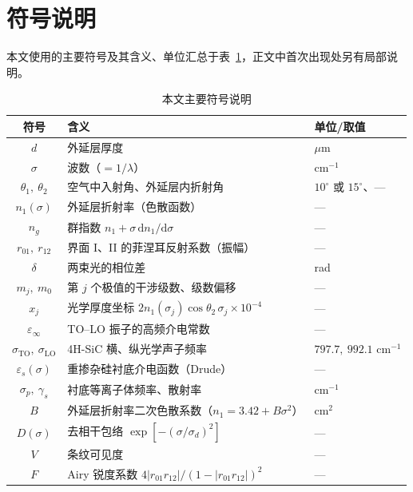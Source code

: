 \documentclass[11pt,a4paper,fontset=fandol]{ctexart}
\begin{document}
\section{符号说明}

本文使用的主要符号及其含义、单位汇总于表~\ref{tab:symbols}，正文中首次出现处另有局部说明。
\begin{table}[!htb]
    \centering
    \caption{本文主要符号说明}
    \label{tab:symbols}
    \small
    \begin{tabular}{cll}
        \toprule
        符号 & 含义 & 单位/取值 \\
        \midrule
        $d$ & 外延层厚度 & $\mu$m \\
        $\sigma$ & 波数（$=1/\lambda$） & cm$^{-1}$ \\
        $\theta_1,\ \theta_2$ & 空气中入射角、外延层内折射角 & $10^\circ$ 或 $15^\circ$、— \\
        $n_1(\sigma)$ & 外延层折射率（色散函数） & — \\
        $n_g$ & 群指数 $n_1+\sigma\,\mathrm{d}n_1/\mathrm{d}\sigma$ & — \\
        $r_{01},\ r_{12}$ & 界面 I、II 的菲涅耳反射系数（振幅） & — \\
        $\delta$ & 两束光的相位差 & rad \\
        $m_j,\ m_0$ & 第 $j$ 个极值的干涉级数、级数偏移 & — \\
        $x_j$ & 光学厚度坐标 $2n_1(\sigma_j)\cos\theta_2\,\sigma_j\times10^{-4}$ & — \\
        $\varepsilon_\infty$ & TO--LO 振子的高频介电常数 & — \\
        $\sigma_{\mathrm{TO}},\ \sigma_{\mathrm{LO}}$ & 4H-SiC 横、纵光学声子频率 & $797.7,\ 992.1$ cm$^{-1}$ \\
        $\varepsilon_s(\sigma)$ & 重掺杂硅衬底介电函数（Drude） & — \\
        $\sigma_p,\ \gamma_s$ & 衬底等离子体频率、散射率 & cm$^{-1}$ \\
        $B$ & 外延层折射率二次色散系数（$n_1=3.42+B\sigma^2$） & cm$^{2}$ \\
        $D(\sigma)$ & 去相干包络 $\exp[-(\sigma/\sigma_d)^2]$ & — \\
        $V$ & 条纹可见度 & — \\
        $F$ & Airy 锐度系数 $4|r_{01}r_{12}|/(1-|r_{01}r_{12}|)^2$ & — \\
        \bottomrule
    \end{tabular}
\end{table}
\end{document}
